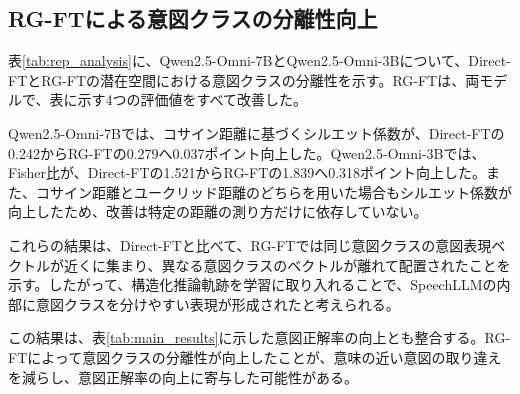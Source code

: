 \documentclass[11pt,a4paper]{ltjsarticle}
\begin{document}
\subsection{RG-FTによる意図クラスの分離性向上}
表\ref{tab:rep_analysis}に、Qwen2.5-Omni-7BとQwen2.5-Omni-3Bについて、Direct-FTとRG-FTの潜在空間における意図クラスの分離性を示す。RG-FTは、両モデルで、表に示す4つの評価値をすべて改善した。

\begin{table}[htbp]
\centering
\small
\caption{Direct-FTとRG-FTの潜在空間における意図クラスの分離性。すべての指標は、値が高いほど意図クラスを分けやすいことを示す。}
\label{tab:rep_analysis}
\end{table}

Qwen2.5-Omni-7Bでは、コサイン距離に基づくシルエット係数が、Direct-FTの0.242からRG-FTの0.279へ0.037ポイント向上した。Qwen2.5-Omni-3Bでは、Fisher比が、Direct-FTの1.521からRG-FTの1.839へ0.318ポイント向上した。また、コサイン距離とユークリッド距離のどちらを用いた場合もシルエット係数が向上したため、改善は特定の距離の測り方だけに依存していない。

これらの結果は、Direct-FTと比べて、RG-FTでは同じ意図クラスの意図表現ベクトルが近くに集まり、異なる意図クラスのベクトルが離れて配置されたことを示す。したがって、構造化推論軌跡を学習に取り入れることで、SpeechLLMの内部に意図クラスを分けやすい表現が形成されたと考えられる。

この結果は、表\ref{tab:main_results}に示した意図正解率の向上とも整合する。RG-FTによって意図クラスの分離性が向上したことが、意味の近い意図の取り違えを減らし、意図正解率の向上に寄与した可能性がある。
\end{document}
